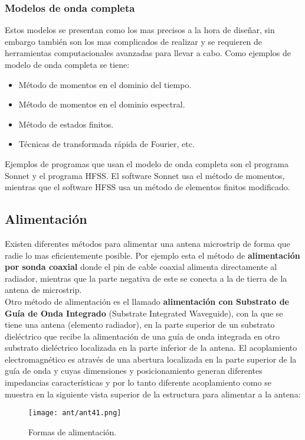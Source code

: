 \documentclass[
	12pt, %
	fleqn, %
	a4paper, %
	oneside, %
]{LegrandOrangeBook}
\begin{document}
\subsubsection{Modelos de onda completa}
Estos modelos se presentan como los mas precisos a la hora de diseñar, sin embargo también son los mas complicados de realizar y se requieren de herramientas computacionales avanzadas para llevar a cabo.
Como ejemplos de modelo de onda completa se tiene:
\begin{itemize}
\item Método de momentos en el dominio del tiempo.
\item Método de momentos en el dominio espectral.
\item Método de estados finitos.
\item Técnicas de transformada rápida de Fourier, etc.
\end{itemize}
\begin{notation}
Ejemplos de programas que usan el modelo de onda completa son el programa Sonnet y el programa HFSS. El software Sonnet usa el método de momentos, mientras que el software HFSS usa un método de elementos finitos modificado.
\end{notation}
\subsection{Alimentación}
Existen diferentes métodos para alimentar una antena microstrip de forma que radie lo mas eficientemente posible.
Por ejemplo esta el método de \textbf{alimentación por sonda coaxial} donde el pin de cable coaxial alimenta directamente al radiador, mientras que la parte negativa de este se conecta a la de tierra de la antena de microstrip.\\
Otro método de alimentación es el llamado \textbf{alimentación con Substrato de Guía de Onda Integrado} (Substrate Integrated Waveguide), con la que se tiene una antena (elemento radiador), en la parte superior de un substrato dieléctrico que recibe la alimentación de una guía de onda integrada en otro substrato dieléctrico localizada en la parte inferior de la antena. El acoplamiento electromagnético es através de una abertura localizada en la parte superior de la guía de onda y cuyas dimensiones y posicionamiento generan diferentes impedancias características y por lo tanto diferente acoplamiento como se muestra en la siguiente vista superior de la estructura para alimentar a la antena:
\begin{figure}[H]
\centering
\texttt{[image: ant/ant41.png]}
\caption{Formas de alimentación.}
\end{figure}
\end{document}
